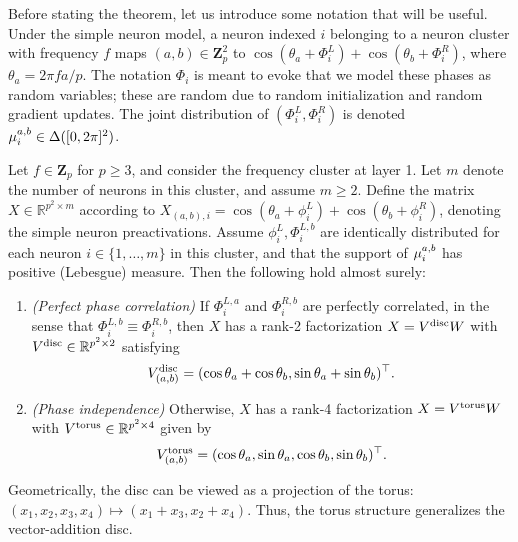 Before stating the theorem, let us introduce some notation that will be useful.
Under the simple neuron model, a neuron indexed $i$ belonging to a neuron cluster with frequency $f$ maps $(a, b)\in\mathbf{Z}_p^2$ to $\cos(\theta_a + \Phi_i^{L}) + \cos(\theta_b + \Phi_i^{R})$, where $\theta_a = 2\pi fa/p$.
The notation $\Phi_i$ is meant to evoke that we model these phases as random variables; these are random due to random initialization and random gradient updates.
The joint distribution of $(\Phi_i^{L}, \Phi_i^{R})$ is denoted $\mu_{i}^{a, b}\in\Delta([0,2\pi]^2)$.

\begin{theorem}
    \label{thm:disc-torus}
    Let $f\in\mathbf{Z}_p$ for $p\geq 3$, and consider the frequency cluster at layer 1.
    Let $m$ denote the number of neurons in this cluster, and assume $m\geq 2$.
    Define the matrix $X\in\mathbb{R}^{p^2\times m}$ according to $X_{(a, b), i} = \cos(\theta_a + \phi^L_i) + \cos(\theta_b + \phi^R_i)$, denoting the simple neuron preactivations.
    Assume $\phi^L_i, \Phi^{L, b}_i$ are identically distributed for each neuron $i\in\{1,\dots,m\}$ in this cluster, and that the support of $\mu_{i}^{a, b}$ has positive (Lebesgue) measure. Then the following hold almost surely:
    \begin{enumerate}
        \item\emph{(Perfect phase correlation)} If $\Phi_i^{L, a}$ and $\Phi_i^{R, b}$ are perfectly correlated, in the sense that $\Phi_i^{L, b} \equiv \Phi_i^{R, b}$, then $X$ has a rank-2 factorization $X = V^{\rm disc}W$ with $V^{\rm disc}\in\mathbb{R}^{p^2\times 2}$ satisfying
        \begin{equation}\label{eq:factorization:disc}
            V^{\rm disc}_{(a, b)} = (\cos\theta_a + \cos\theta_b, \sin\theta_a + \sin\theta_b)^\top.
        \end{equation}
        \item\emph{(Phase independence)} Otherwise, $X$ has a rank-4 factorization $X = V^{\rm torus}W$ with $V^{\rm torus}\in\mathbb{R}^{p^2\times 4}$ given by
        \begin{equation}\label{eq:factorization:torus}
            V^{\rm torus}_{(a, b)} = (\cos\theta_a, \sin\theta_a, \cos\theta_b, \sin\theta_b)^\top.
        \end{equation}
    \end{enumerate}
\end{theorem}

Geometrically, the disc can be viewed as a projection of the torus: $(x_1, x_2, x_3, x_4) \mapsto (x_1 + x_3, x_2 + x_4)$. Thus, the torus structure generalizes the vector-addition disc.

